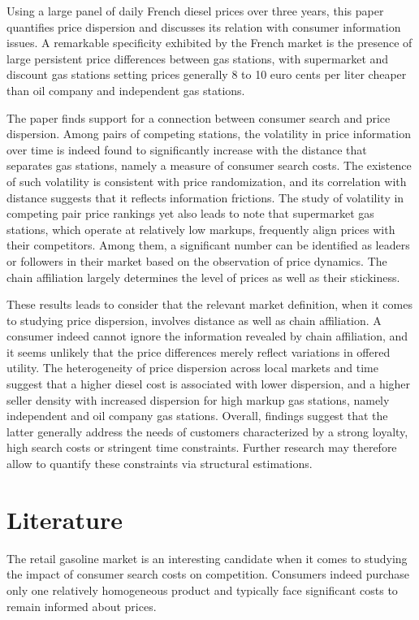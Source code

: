 \documentclass[english]{article}
\begin{document}
Using a large panel of daily French diesel prices over three years, this paper quantifies price dispersion and discusses its relation with consumer information issues. A remarkable specificity exhibited by the French market is the presence of large persistent price differences between gas stations, with supermarket and discount gas stations setting prices generally 8 to 10 euro cents per liter cheaper than oil company and independent gas stations. 

The paper finds support for a connection between consumer search and price dispersion. Among pairs of competing stations, the volatility in price information over time is indeed found to significantly increase with the distance that separates gas stations, namely a measure of consumer search costs. The existence of such volatility is consistent with price randomization, and its correlation with distance suggests that it reflects information frictions. The study of volatility in competing pair price rankings yet also leads to note that supermarket gas stations, which operate at relatively low markups, frequently align prices with their competitors. Among them, a significant number can be identified as leaders or followers in their market based on the observation of price dynamics. The chain affiliation largely determines the level of prices as well as their stickiness.

These results leads to consider that the relevant market definition, when it comes to studying price dispersion, involves distance as well as chain affiliation. A consumer indeed cannot ignore the information revealed by chain affiliation, and it seems unlikely that the price differences merely reflect variations in offered utility. The heterogeneity of price dispersion across local markets and time suggest that a higher diesel cost is associated with lower dispersion, and a higher seller density with increased dispersion for high markup gas stations, namely independent and oil company gas stations. Overall, findings suggest that the latter generally address the needs of customers characterized by a strong loyalty, high search costs or stringent time constraints. Further research may therefore allow to quantify these constraints via structural estimations.

\section{Literature}

The retail gasoline market is an interesting candidate when it comes to studying the impact of consumer search costs on competition. Consumers indeed purchase only one relatively homogeneous product and typically face significant costs to remain informed about prices.
\end{document}
